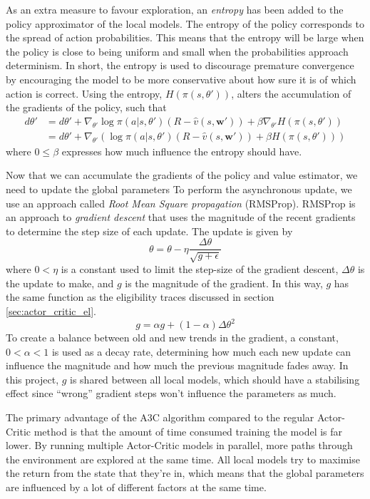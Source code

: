 \documentclass[11pt]{article}
\begin{document}
As an extra measure to favour exploration, an \textit{entropy} has been added
to the policy approximator of the local models.
The entropy of the policy corresponds to the spread of action probabilities.
This means that the entropy will be large when the policy is close to being
uniform and small when the probabilities approach determinism.
In short, the entropy is used to discourage premature convergence
by encouraging the model to be more conservative about how sure it is
of which action is correct.
Using the entropy, $H(\pi(s, \theta'))$, alters the accumulation of the gradients
of the policy, such that
\begin{equation}
    \begin{aligned}
        d\theta' & = d\theta' + \nabla_{\theta'} \log \pi(a|s, \theta')(R - \hat{v}(s, \mathbf{w}')) + \beta \nabla_{\theta'} H(\pi(s, \theta'))\\
                 & = d\theta' + \nabla_{\theta'} (\log \pi(a|s, \theta')(R - \hat{v}(s, \mathbf{w}')) + \beta H(\pi(s, \theta')))
    \end{aligned}
\end{equation}
where $0 \leq \beta$ expresses how much influence the entropy should have.

Now that we can accumulate the gradients of the policy and value estimator, we need to update the
global parameters
To perform the asynchronous update, we use an approach called \textit{Root Mean Square propagation} (RMSProp).
RMSProp is an approach to \textit{gradient descent} 
that uses the magnitude of the recent gradients to
determine the step size of each update.
The update is given by 
\begin{equation}
    \theta = \theta - \eta \frac{\Delta \theta}{\sqrt{g + \epsilon}}
\end{equation}
where $0 < \eta$ is a constant used to limit the step-size of the gradient descent, $\Delta \theta$ is
the update to make, and 
$g$ is the magnitude of the gradient.
In this way, $g$ has the same function as the eligibility traces discussed in
section \ref{sec:actor_critic_el}.
\begin{equation}
    g = \alpha g + (1 - \alpha) \Delta \theta^2
\end{equation}
To create a balance between old and new trends in the gradient,
a constant, $0 < \alpha < 1$ is used as a decay rate,
determining how much each new update can influence the magnitude and how much the previous magnitude fades away.
In this project, $g$ is shared between all local models, which should have a stabilising
effect since “wrong” gradient steps won't influence the parameters as much.

The primary advantage of the A3C algorithm compared to the regular Actor-Critic method
is that the amount of time consumed training the model is far lower.
By running multiple Actor-Critic models in parallel, more paths through the environment are explored
at the same time.
All local models try to maximise the return from the state that they're in, which means that
the global parameters are influenced by a lot of different factors at the same time.
\end{document}
